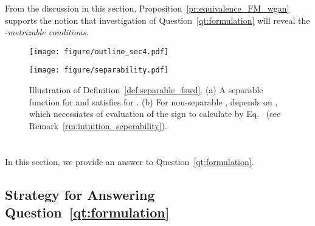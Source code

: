 From the discussion in this section, Proposition~\ref{pr:equivalence_FM_wgan} supports the notion that investigation of Question~\ref{qt:formulation} will reveal the -\textit{metrizable conditions}.




\begin{figure}[t]
\begin{minipage}[c]{0.45\columnwidth}
\centering
\texttt{[image: figure/outline\_sec4.pdf]}
    \caption{
    Outline of Sec.~\ref{sec:fmh_is_distance}. Proposition~\ref{pr:fm_is_distance_if_injective_and_separable} is a major step toward our main theorem.
    }
    \label{fig:outline_sec4}
\end{minipage}
\hspace{0.02\columnwidth}
\begin{minipage}[c]{0.51\columnwidth}
\centering
\texttt{[image: figure/separability.pdf]}
   \caption{
   Illustration of Definition~\ref{def:separable_fswd}. (a) A separable function  for  and  satisfies  for . (b) For non-separable ,  depends on , which necessiates of evaluation of the sign to calculate  by Eq.~ (see Remark~\ref{rm:intuition_seperability}).
   }
   \label{fig:separability}
\end{minipage}
\end{figure}


\section{}
\label{sec:fmh_is_distance}

In this section, we provide an answer to Question~\ref{qt:formulation}.


\subsection{Strategy for Answering Question~\ref{qt:formulation}}
\label{ssec:strategy}

